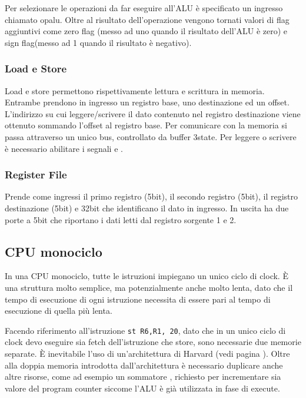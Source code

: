 \documentclass[../ace.tex]{subfiles}
\begin{document}
Per selezionare le operazioni da far eseguire all'ALU è specificato un ingresso chiamato opalu.
Oltre al risultato  dell'operazione vengono tornati valori di flag aggiuntivi come zero flag (messo ad uno quando il risultato dell'ALU è zero) e sign flag(messo ad 1 quando il risultato è negativo).

\subsubsection{Load e Store}
Load e store permettono rispettivamente lettura e scrittura in memoria.
Entrambe prendono in ingresso un registro base, uno destinazione ed un offset.
L'indirizzo su cui leggere/scrivere il dato contenuto nel registro destinazione viene ottenuto sommando l'offset al registro base.
Per comunicare con la memoria si passa attraverso un unico bus, controllato da buffer 3state. Per leggere o scrivere è necessario abilitare i segnali
 e .

\subsubsection{Register File}
Prende come ingressi il primo registro (5bit), il secondo registro (5bit), il registro destinazione (5bit) e 32bit che identificano il dato in ingresso.
In uscita ha due porte a 5bit che riportano i dati letti dal registro sorgente 1 e 2.

\def\tmono{T_\text{mono}}
\def\tmulti{T_\text{multi}}
\subsection{CPU monociclo}
In una CPU monociclo, tutte le istruzioni impiegano un unico ciclo di clock. È una struttura molto semplice, ma potenzialmente anche molto
lenta, dato che il tempo di esecuzione di ogni istruzione necessita di essere pari al tempo di esecuzione di quella più lenta.

Facendo riferimento all'istruzione \lstinline{st R6,R1, 20},
dato che in un unico ciclo di clock devo eseguire sia fetch dell'istruzione che store, sono necessarie due memorie separate.
È inevitabile l'uso di un'architettura di Harvard (vedi pagina \pageref{sec:architettura_harvard}).
Oltre alla doppia memoria introdotta dall'architettura è necessario duplicare anche altre risorse, come ad esempio un sommatore , richiesto per incrementare sia valore del program counter siccome l'ALU è già utilizzata in fase di execute.
\end{document}
